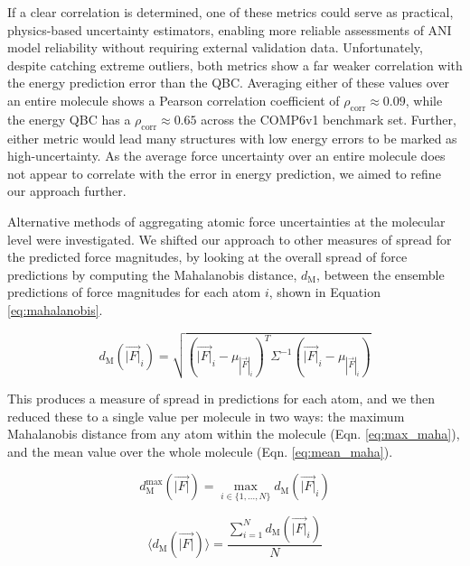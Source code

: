 If a clear correlation is determined, one of these metrics could serve as practical, physics-based uncertainty estimators, enabling more reliable assessments of ANI model reliability without requiring external validation data.
Unfortunately, despite catching extreme outliers, both metrics show a far weaker correlation with the energy prediction error than the QBC.
Averaging either of these values over an entire molecule shows a Pearson correlation coefficient of $\rho_{\text{corr}} \approx 0.09$, while the energy QBC has a $\rho_{\text{corr}} \approx 0.65$ across the COMP6v1 benchmark set.
Further, either metric would lead many structures with low energy errors to be marked as high-uncertainty.
As the average force uncertainty over an entire molecule does not appear to correlate with the error in energy prediction, we aimed to refine our approach further.

Alternative methods of aggregating atomic force uncertainties at the molecular level were investigated. 
We shifted our approach to other measures of spread for the predicted force magnitudes, by looking at the overall spread of force predictions by computing the Mahalanobis distance, $d_\text{M}$, between the ensemble predictions of force magnitudes for each atom $i$, shown in Equation \ref{eq:mahalanobis}.

\begin{equation}
    d_\text{M}\left(\vec{|F|}_i\right) = \sqrt{ \left( \vec{|F|}_i - \mu_{|\vec{F}|_i} \right)^T {\Sigma}^{-1} \left( \vec{|F|}_i - \mu_{|\vec{F}|_i} \right) }
    \label{eq:mahalanobis}
\end{equation}

This produces a measure of spread in predictions for each atom, and we then reduced these to a single value per molecule in two ways: the maximum Mahalanobis distance from any atom within the molecule (Eqn. \ref{eq:max_maha}), and the mean value over the whole molecule (Eqn. \ref{eq:mean_maha}).

\begin{equation}
    d_\text{M}^\text{max} \left(\vec{|F|}\right) = \max_{i \in \{1, \dots, N\}} d_\text{M} \left( \vec{|F|}_i \right)
    \label{eq:max_maha}
\end{equation}

\begin{equation}
    \langle d_\text{M} \left(\vec{|F|}\right) \rangle = \frac{\sum_{i=1}^{N} d_\text{M} \left( \vec{|F|}_i \right)} {N}
    \label{eq:mean_maha}
\end{equation}


